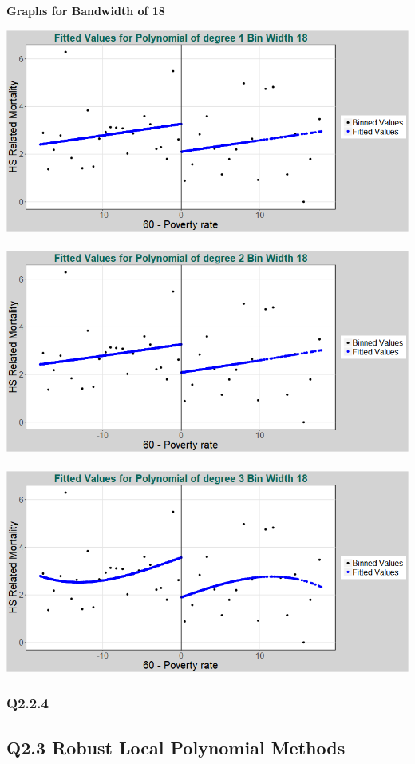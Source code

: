 \documentclass[11pt]{article}
\begin{document}
\begin{center}
	{\large \bf{Graphs for Bandwidth of 18}}
\end{center}

\includegraphics[width=.8\linewidth]{plot_223_poly_1_bw_18.png}
\\ \\
\includegraphics[width=.8\linewidth]{plot_223_poly_2_bw_18.png}
\\ \\
\includegraphics[width=.8\linewidth]{plot_223_poly_3_bw_18.png}

\subsubsection{Q2.2.4}



\subsection{Q2.3 Robust Local Polynomial Methods}
\end{document}
